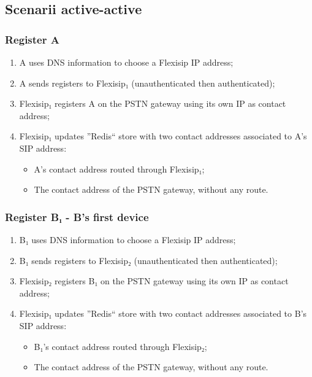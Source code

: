 \documentclass[a4paper,10pt]{article}
\begin{document}
\subsection{Scenarii active-active}

\subsubsection{Register A}
\begin{enumerate}
 \item A uses DNS information to choose a Flexisip IP address;
 \item A sends registers to Flexisip₁ (unauthenticated then authenticated);
 \item Flexisip₁ registers A on the PSTN gateway using its own IP as contact address;
 \item Flexisip₁ updates ''Redis`` store with two contact addresses associated to A's SIP address:
    \begin{itemize}
      \item A's contact address routed through Flexisip₁;
      \item The contact address of the PSTN gateway, without any route.
    \end{itemize}
\end{enumerate}

\subsubsection{Register B₁ - B's first device}
\begin{enumerate}
 \item B₁ uses DNS information to choose a Flexisip IP address;
 \item B₁ sends registers to Flexisip₂ (unauthenticated then authenticated);
 \item Flexisip₂ registers B₁ on the PSTN gateway using its own IP as contact address;
 \item Flexisip₁ updates ''Redis`` store with two contact addresses associated to B's SIP address:
    \begin{itemize}
      \item B₁'s contact address routed through Flexisip₂;
      \item The contact address of the PSTN gateway, without any route.
    \end{itemize}
\end{enumerate}
\end{document}
